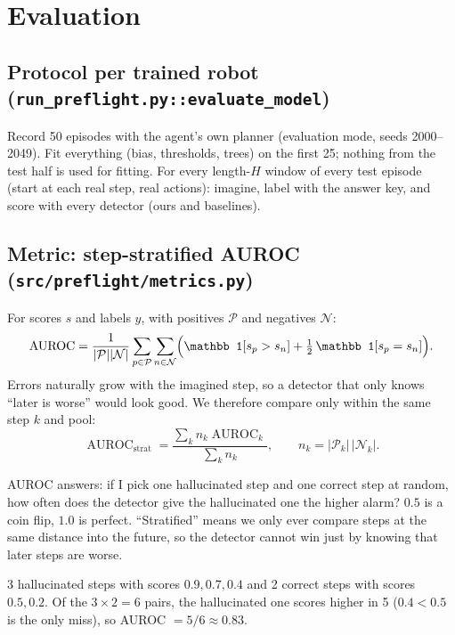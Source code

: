 \documentclass[11pt]{article}
\newcommand{\code}[1]{\texttt{#1}}
\begin{document}
\section{Evaluation}\label{sec:eval}

\subsection{Protocol per trained robot (\code{run\_preflight.py::evaluate\_model})}

Record 50 episodes with the agent's own planner (evaluation mode, seeds 2000--2049). Fit everything (bias,
thresholds, trees) on the first 25; nothing from the test half is used for fitting. For every length-$H$ window of
every test episode (start at each real step, real actions): imagine, label with the answer key, and score with
every detector (ours and baselines).

\subsection{Metric: step-stratified AUROC (\code{src/preflight/metrics.py})}

For scores $s$ and labels $y$, with positives $\mathcal P$ and negatives $\mathcal N$:
\[
\operatorname{AUROC}=\frac{1}{|\mathcal P||\mathcal N|}\sum_{p\in\mathcal P}\sum_{n\in\mathcal N}
\Bigl(\mathbb 1[s_p>s_n]+\tfrac12\,\mathbb 1[s_p=s_n]\Bigr).
\]
Errors naturally grow with the imagined step, so a detector that only knows ``later is worse'' would look good.
We therefore compare only within the same step $k$ and pool:
\[
\operatorname{AUROC}_{\text{strat}}=\frac{\sum_k n_k\operatorname{AUROC}_k}{\sum_k n_k},\qquad n_k=|\mathcal P_k|\,|\mathcal N_k|.
\]

\begin{inwords}
AUROC answers: if I pick one hallucinated step and one correct step at random, how often does the detector give the
hallucinated one the higher alarm? $0.5$ is a coin flip, $1.0$ is perfect. ``Stratified'' means we only ever compare
steps at the same distance into the future, so the detector cannot win just by knowing that later steps are worse.
\end{inwords}

\begin{example}
3 hallucinated steps with scores $0.9,0.7,0.4$ and 2 correct steps with scores $0.5,0.2$. Of the $3\times2=6$ pairs,
the hallucinated one scores higher in 5 ($0.4<0.5$ is the only miss), so AUROC $=5/6\approx0.83$.
\end{example}
\end{document}
